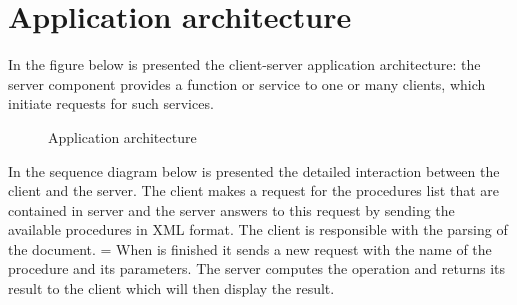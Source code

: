 \documentclass{llncs}
\begin{document}
	
\section*{Application architecture}

In the figure below is presented the client-server application architecture: the server component provides a function or service to one or many clients, which initiate requests for such services.
\begin{figure}
\caption{Application architecture}
\begin{center}
\end{center}
\end{figure}

In the sequence diagram below is presented the detailed interaction between the client and the server. The client makes a request for the procedures list that are contained in server and the server answers to this request by sending the available procedures in XML format. The client is responsible with the parsing of the document. 
\parskip = \baselineskip  %
When is finished it sends a new request with the name of the procedure and its parameters. The server computes the operation and returns its result to the client which will then display the result. 
\end{document}
